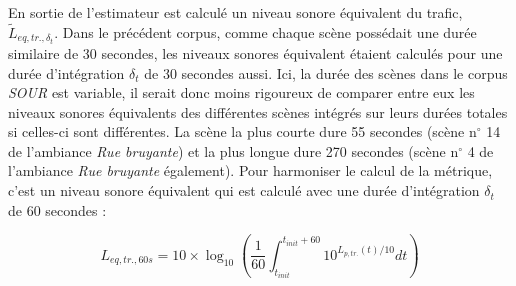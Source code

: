 \begin{table}[t]




\label{tab:experimental_factorsNMF}
\end{table}

 
En sortie de l'estimateur est calculé un niveau sonore équivalent du trafic, $\tilde{L}_{eq,tr.,\delta_t}$. Dans le précédent corpus, comme chaque scène possédait une durée similaire de 30 secondes, les niveaux sonores équivalent étaient calculés pour une durée d'intégration $\delta_t$ de 30 secondes aussi. Ici, la durée des scènes dans le corpus \textit{SOUR} est variable, il serait donc moins rigoureux de comparer entre eux les niveaux sonores équivalents des différentes scènes intégrés sur leurs durées totales si celles-ci sont différentes. La scène la plus courte dure 55 secondes (scène n$^{\circ}$ 14 de l'ambiance \textit{Rue bruyante}) et la plus longue dure 270 secondes (scène n$^{\circ}$ 4 de l'ambiance \textit{Rue bruyante} également). Pour harmoniser le calcul de la métrique, c'est un niveau sonore équivalent qui est calculé avec une durée d'intégration $\delta_t$ de 60 secondes : 

\begin{equation}
L_{eq,tr.,60s} = 10 \times \log_{10}\left(\frac{1}{60}\int_{t_{init}}^{t_{init}+60} 10^{L_{p,tr.}(t)/10} dt\right)
\end{equation}

